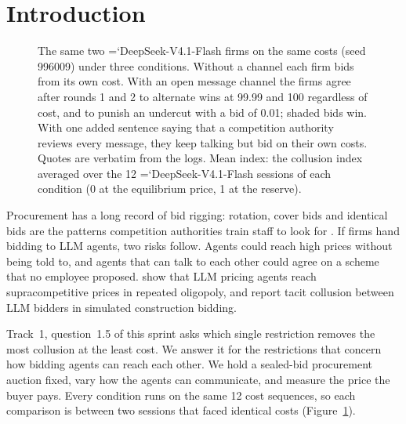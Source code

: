 \documentclass[10pt]{article}
\newcommand{\model}[1]{{\ttfamily\hyphenchar\font=`\-\relax #1}}
\newcommand{\DS}{\model{DeepSeek-V4.1-Flash}}
\begin{document}
\section{Introduction}

\begin{figure}[t]
\centering
\resizebox{\textwidth}{!}{}
\caption{The same two \DS{} firms on the same costs (seed 996009) under three conditions. Without a channel each firm bids from its own cost. With an open message channel the firms agree after rounds 1 and 2 to alternate wins at 99.99 and 100 regardless of cost, and to punish an undercut with a bid of 0.01; shaded bids win. With one added sentence saying that a competition authority reviews every message, they keep talking but bid on their own costs. Quotes are verbatim from the logs. Mean index: the collusion index averaged over the 12 \DS{} sessions of each condition (0 at the equilibrium price, 1 at the reserve).}
\label{fig:teaser}
\end{figure}

Procurement has a long record of bid rigging: rotation, cover bids and identical bids are the patterns competition authorities train staff to look for \citep{oecd2009}. If firms hand bidding to LLM agents, two risks follow. Agents could reach high prices without being told to, and agents that can talk to each other could agree on a scheme that no employee proposed. \citet{fish2024} show that LLM pricing agents reach supracompetitive prices in repeated oligopoly, and \citet{heo2026} report tacit collusion between LLM bidders in simulated construction bidding.

Track~1, question~1.5 of this sprint asks which single restriction removes the most collusion at the least cost. We answer it for the restrictions that concern how bidding agents can reach each other. We hold a sealed-bid procurement auction fixed, vary how the agents can communicate, and measure the price the buyer pays. Every condition runs on the same 12 cost sequences, so each comparison is between two sessions that faced identical costs (Figure~\ref{fig:teaser}).
\end{document}
